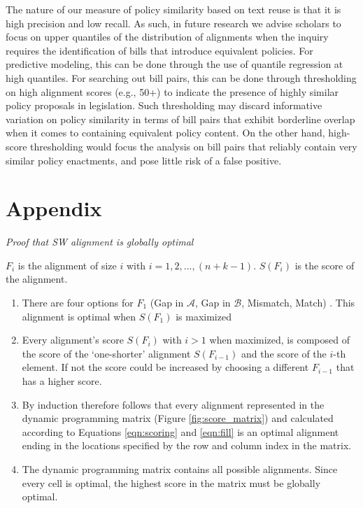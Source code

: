 \documentclass[12pt]{article} %
\begin{document}
The nature of our measure of policy similarity based on text reuse is that it is high precision and low recall.  As such, in future research we advise scholars to focus on upper quantiles of the distribution of alignments when the inquiry requires the identification of bills that introduce equivalent policies. For predictive modeling, this can be done through the use of quantile regression at high quantiles. For searching out bill pairs, this can be done through thresholding on high alignment scores (e.g., 50+) to indicate the presence of highly similar policy proposals in legislation. Such thresholding may discard informative variation on policy similarity in terms of bill pairs that exhibit borderline overlap when it comes to containing equivalent policy content. On the other hand, high-score thresholding would focus the analysis on bill pairs that reliably contain very similar policy enactments, and pose little risk of a false positive.





\clearpage

\section*{Appendix}

\textit{Proof that SW alignment is globally optimal}

$F_i$ is the alignment of size $i$ with $i = 1,2,...,(n + k - 1)$. $S(F_i)$ is the score of the alignment.

\begin{enumerate}
\item There are four options for $F_1$ (Gap in $\mathcal{A}$, Gap in
    $\mathcal{B}$, Mismatch, Match) . This alignment is optimal when $S(F_1)$ is maximized
\item Every alignment's score $S(F_i)$ with $i > 1$ when maximized, is composed of the score of the `one-shorter' alignment $S(F_{i-1})$ and the score of the $i$-th element. If not the score could be increased by choosing a different $F_{i-1}$ that has a higher score.
\item By induction therefore follows that every alignment represented in the
    dynamic programming matrix (Figure \ref{fig:score_matrix}) and calculated according
        to Equations \ref{eqn:scoring} and \ref{eqn:fill} is an optimal alignment
    ending in the locations specified by the row and column index in the matrix.
\item The dynamic programming matrix contains all possible alignments. Since
    every cell is optimal, the highest score in the matrix must be globally
    optimal.
\end{enumerate}
\end{document}
